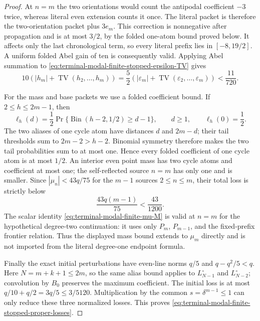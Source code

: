 \begin{proof}
At $n=m$ the two orientations would count the antipodal coefficient $-3$
twice, whereas literal even extension counts it once.  The literal packet
is therefore the two-orientation packet plus $3e_m$.  This correction is
nonnegative after propagation and is at most $3/2$, by the folded
one-atom bound proved below.  It affects only the last chronological term,
so every literal prefix lies in $[-8,19/2]$.  A uniform folded Abel gain of
ten is consequently valid.  Applying Abel summation to
\eqref{eq:terminal-modal-finite-stopped-epsilon-TV} gives
\begin{equation}
 10\left(|h_m|+\operatorname{TV}(h_2,\ldots,h_m)\right)
 =\frac52\left(|\varepsilon_m|+\operatorname{TV}(\varepsilon_2,\ldots,
 \varepsilon_m)\right)<\frac{11}{720}.
 \label{eq:terminal-modal-finite-stopped-derivative-loss}
\end{equation}

For the mass and base packets we use a folded coefficient bound.  If
$2\le h\le2m-1$, then
\begin{equation}
 \ell_h(d)=\frac12\Pr\{\operatorname{Bin}(h-2,1/2)\ge d-1\},
 \qquad d\ge1,\qquad \ell_h(0)=\frac12.
\end{equation}
The two aliases of one cycle atom have distances $d$ and $2m-d$; their tail
thresholds sum to $2m-2>h-2$.  Binomial symmetry therefore makes the two
tail probabilities sum to at most one.  Hence every folded coefficient of
one cycle atom is at most $1/2$.  An interior even point mass has two cycle
atoms and coefficient at most one; the self-reflected source $n=m$ has only
one and is smaller.  Since
$|\mu_n|<43q/75$ for the $m-1$ sources $2\le n\le m$, their total loss is
strictly below
\begin{equation}
\frac{43q(m-1)}{75}<\frac{43}{1200}.
\end{equation}
The scalar identity
\eqref{eq:terminal-modal-finite-mu-M} is valid at $n=m$ for the hypothetical
degree-two continuation: it uses only $P_m$, $P_{m-1}$, and the fixed-prefix
frontier relation.  Thus the displayed mass bound extends to $\mu_m$
directly and is not imported from the literal degree-one endpoint formula.

Finally the exact initial perturbations have even-line norms $q/5$ and
$q-q^2/5<q$.  Here $N=m+k+1\le2m$, so the same alias bound applies to
$L_{N-1}^{\circ}$ and $L_{N-2}^{\circ}$; convolution by $B_0$ preserves the
maximum coefficient.  The initial loss is at most
$q/10+q/2=3q/5\le3/5120$.  Multiplication by the common
$s=\delta^{m-1}\le1$ can only reduce these three normalized losses.  This
proves \eqref{eq:terminal-modal-finite-stopped-proper-losses}.
\end{proof}

